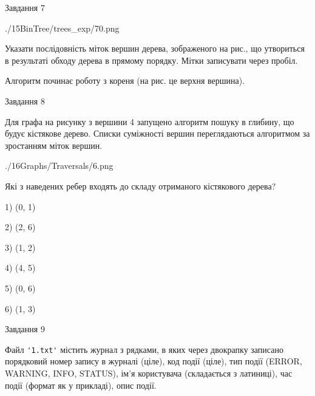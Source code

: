 \documentclass[12pt, ukrainian]{article}
\def\code#1{\Verb!#1!}
\begin{document}
{\vspace{10mm}\par

\newpage
\begin{minipage}[t]{9.7cm}
               
{\begin{center}Завдання {7}\end{center}}
\vspace{-6mm}

\begin{center}
	{./15BinTree/trees_exp/70.png}
\end{center}
Указати послідовність міток вершин дерева, зображеного на рис., що утвориться в результаті обходу дерева в прямому порядку. Мітки записувати через пробіл.\par Алгоритм починає роботу з кореня (на рис. це верхня вершина).\par

\end{minipage}
\vline \hspace{8mm}
\begin{minipage}[t]{8.0cm}
               
{\begin{center}Завдання {8}\end{center}}
\vspace{-6mm}
Для графа на рисунку з вершини 4 запущено алгоритм пошуку в глибину, що будує кістякове дерево. Списки суміжності вершин переглядаються алгоритмом за зростанням міток вершин.\par
\begin{center}
	{./16Graphs/Traversals/6.png}
\end{center}
\par Які з наведених ребер входять до складу отриманого кістякового дерева?\par
1) (0, 1)\par
2) (2, 6)\par
3) (1, 2)\par
4) (4, 5)\par
5) (0, 6)\par
6) (1, 3)\par
{\vskip 15pt} \par

\end{minipage}

               
{\begin{center}Завдання {9}\end{center}}
\vspace{-6mm}
Файл \code{'1.txt'} містить журнал з рядками, в яких через двокрапку записано поряд\-ко\-вий номер запису в журналі (ціле), код події (ціле), тип події (ERROR, \\WARNING, INFO, STATUS), ім'я користувача (складається з латиниці), час події (фор\-мат як у прикладі), опис події.

}
\end{document}
